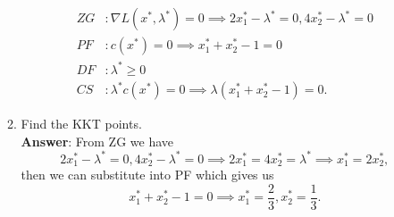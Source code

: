 \documentclass{article}
\begin{document}
\begin{enumerate}
\begin{enumerate}
\begin{align*}
                        ZG & : \nabla L(x^*,\lambda^*)=0\implies 2x^*_1-\lambda^*=0,4x^*_2-\lambda^*=0 \\
                        PF & : c(x^*)=0\implies x^*_1+x^*_2-1=0                                        \\
                        DF & : \lambda^*\geq 0                                                         \\
                        CS & : \lambda^*c(x^*)=0\implies\lambda(x^*_1+x^*_2-1)=0.
                    \end{align*}
              \item Find the KKT points.\\
                    \textbf{Answer}: From ZG we have \[
                        2x^*_1-\lambda^*=0,4x^*_2-\lambda^*=0\implies 2x^*_1=4x^*_2=\lambda^*\implies x^*_1=2x^*_2,
                    \] then we can substitute into PF which gives us \[
                        x^*_1+x^*_2-1=0\implies x^*_1=\frac{2}{3},x^*_2=\frac{1}{3}.
                    \]
          \end{enumerate}
\end{enumerate}
\end{document}
